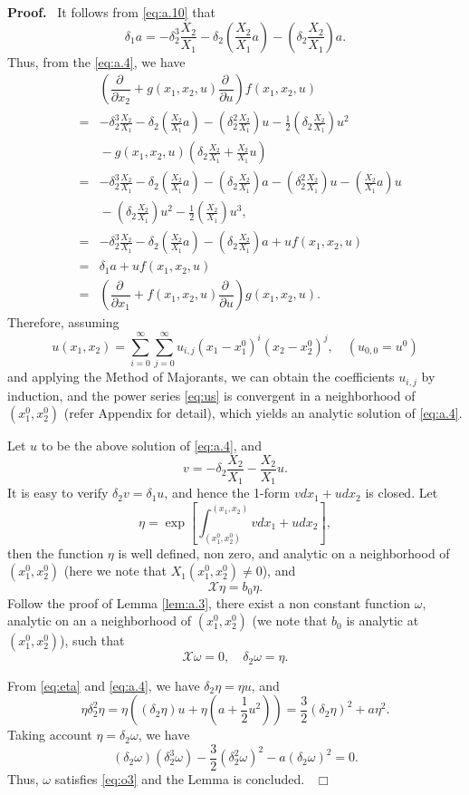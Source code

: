 \documentclass[preprint,12pt]{elsarticle}
\newenvironment{proof}[1][Proof]{\textbf{#1.}\ }{\ $\Box$}
\begin{document}
\begin{proof}
It follows from \eqref{eq:a.10} that
$$\delta_1a = - \delta_2^3 \dfrac{X_2}{X_1} - \delta_2 (\dfrac{X_2}{X_1} a) - (\delta_2 \dfrac{X_2}{X_1}) a .$$
Thus, from the \eqref{eq:a.4}, we have
\begin{eqnarray*}
&&(\dfrac{\partial\ }{\partial x_2} + g(x_1,x_2,u)\dfrac{\partial\ }{\partial u} ) f(x_1,x_2,u)\\
&=&-\delta_2^3\frac{X_2}{X_1} - \delta_2(\frac{X_2}{X_1}a) -
(\delta_2^2\frac{X_2}{X_1}) u - \frac{1}{2}(\delta_2\frac{X_2}{X_1}) u^2\\ 
&&{} - g(x_1,x_2,u) (\delta_2\frac{X_2}{X_1}  +\frac{X_2}{X_1}u) \\
&=&-\delta_2^3\frac{X_2}{X_1} - \delta_2(\frac{X_2}{X_1}a) - (\delta_2\frac{X_2}{X_1}) a -
(\delta_2^2\frac{X_2}{X_1}) u - (\frac{X_2}{X_1}a) u\\
&&{} - (\delta_2\frac{X_2}{X_1}) u^2 - \frac{1}{2}(\frac{X_2}{X_1}) u^3,\\
&=& -\delta_2^3\frac{X_2}{X_1} - \delta_2(\frac{X_2}{X_1}a) - (\delta_2\frac{X_2}{X_1}) a + u f(x_1,x_2,u)\\
&=&\delta_1 a + u f(x_1,x_2,u)\\
&=&(\dfrac{\partial\ }{\partial x_1} + f(x_1,x_2,u)\dfrac{\partial\ }{\partial u}) g(x_1,x_2,u).
\end{eqnarray*}
Therefore, assuming
\begin{equation}
\label{eq:us}
u(x_1,x_2) = \sum_{i=0}^\infty\sum_{j=0}^\infty u_{i,j} (x_1-x_1^0)^i (x_2-x_2^0)^j,\quad (u_{0,0} = u^0)
\end{equation}
and applying the Method of Majorants, we can obtain the coefficients $u_{i,j}$ by induction, and the power series \eqref{eq:us} is convergent in a neighborhood of $(x_1^0,x_2^0)$ (refer Appendix for detail), which yields an analytic solution of \eqref{eq:a.4}.

Let $u$ to be the above solution of \eqref{eq:a.4}, and 
$$v = -\delta_2\frac{X_2}{X_1} - \frac{X_2}{X_1} u.$$
It is easy to verify $\delta_2 v = \delta_1 u$, and hence 
the 1-form $v dx_1 + u dx_2$ is closed. Let
\begin{equation}
\label{eq:eta}
\eta =
\exp\left[\int_{(x_1^0,x_2^0)}^{(x_1,x_2)} v dx_1 + u dx_2\right],
\end{equation}
then the function $\eta$ is well defined, non zero,  and analytic on a neighborhood of $(x_1^0, x_2^0)$ (here we note that $X_1(x_1^0, x_2^0) \not=0$), and
$$\mathscr{X}\eta = b_0 \eta.$$
Follow the proof of Lemma \ref{lem:a.3}, there exist a non constant function $\omega$, analytic on an a neighborhood of $(x_1^0, x_2^0)$ (we note that $b_0$ is analytic at $(x_1^0,x_2^0)$), such that
$$\mathscr{X}\omega = 0,\quad \delta_2 \omega = \eta.$$

From \eqref{eq:eta} and \eqref{eq:a.4}, we have $\delta_2 \eta = \eta u$, and
$$\eta \delta_2^2 \eta = \eta \left((\delta_2 \eta) u + \eta (a + \dfrac{1}{2} u^2)\right) = \dfrac{3}{2}(\delta_2 \eta)^2 + a \eta^2.$$
Taking account $\eta = \delta_2 \omega$, we have
$$(\delta_2 \omega) (\delta_2^3 \omega) - \dfrac{3}{2} (\delta_2^2 \omega)^2 - a (\delta_2 \omega)^2 = 0.$$
Thus, $\omega$ satisfies \eqref{eq:o3} and the Lemma is concluded.  
\end{proof}
\end{document}
